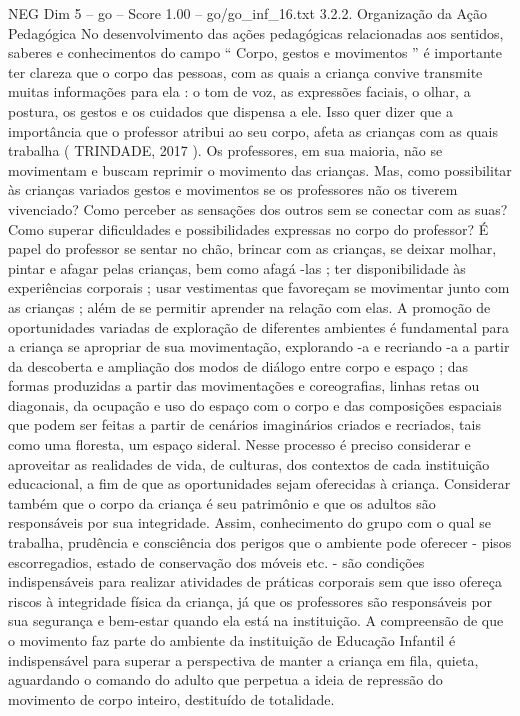 \begin{textsample}{NEG Dim 5 – go – Score 1.00 – go/go\_inf\_16.txt}  \label{ex:f5_neg_280}
3.2.2.
Organização da Ação Pedagógica No desenvolvimento das ações pedagógicas relacionadas aos sentidos, saberes e conhecimentos do campo “ Corpo, gestos e movimentos ” é importante ter clareza que o corpo das pessoas, com as quais a criança convive transmite muitas informações para ela : o tom de voz, as expressões faciais, o olhar, a postura, os gestos e os cuidados que dispensa a ele.
Isso quer dizer que a importância que o professor atribui ao seu corpo, afeta as crianças com as quais trabalha ( TRINDADE, 2017 ).
Os professores, em sua maioria, não se movimentam e buscam reprimir o movimento das crianças.
Mas, como possibilitar às crianças variados gestos e movimentos se os professores não os tiverem vivenciado?
Como perceber as sensações dos outros sem se conectar com as suas?
Como superar dificuldades e possibilidades expressas no corpo do professor?
É papel do professor se sentar no chão, brincar com as crianças, se deixar molhar, pintar e afagar pelas crianças, bem como afagá -las ; ter disponibilidade às experiências corporais ; usar vestimentas que favoreçam se movimentar junto com as crianças ; além de se permitir aprender na relação com elas.
A promoção de oportunidades variadas de exploração de diferentes ambientes é fundamental para a criança se apropriar de sua movimentação, explorando -a e recriando -a a partir da descoberta e ampliação dos modos de diálogo entre corpo e espaço ; das formas produzidas a partir das movimentações e coreografias, linhas retas ou diagonais, da ocupação e uso do espaço com o corpo e das composições espaciais que podem ser feitas a partir de cenários imaginários criados e recriados, tais como uma floresta, um espaço sideral.
Nesse processo é preciso considerar e aproveitar as realidades de vida, de culturas, dos contextos de cada instituição educacional, a fim de que as oportunidades sejam oferecidas à criança.
Considerar também que o corpo da criança é seu patrimônio e que os adultos são responsáveis por sua integridade.
Assim, conhecimento do grupo com o qual se trabalha, prudência e consciência dos perigos que o ambiente pode oferecer - pisos escorregadios, estado de conservação dos móveis etc. - são condições indispensáveis para realizar atividades de práticas corporais sem que isso ofereça riscos à integridade física da criança, já que os professores são responsáveis por sua segurança e bem-estar quando ela está na instituição.
A compreensão de que o movimento faz parte do ambiente da instituição de Educação Infantil é indispensável para superar a perspectiva de manter a criança em fila, quieta, aguardando o comando do adulto que perpetua a ideia de repressão do movimento de corpo inteiro, destituído de totalidade.

\end{textsample}
